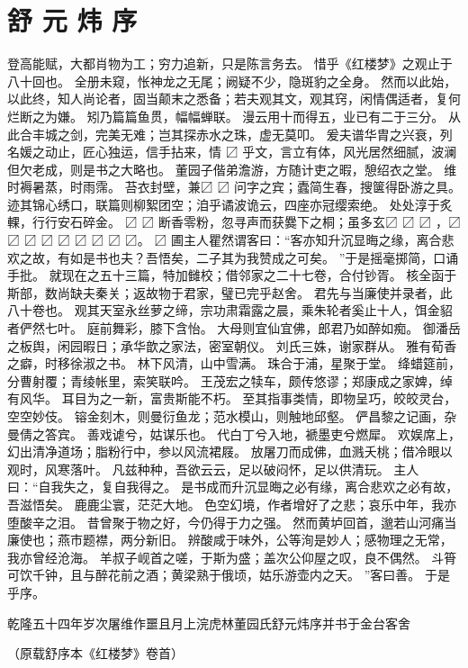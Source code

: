 \section*{舒 元 炜 序}
登高能赋，大都肖物为工；穷力追新，只是陈言务去。
惜乎《红楼梦》之观止于八十回也。
全册未窥，怅神龙之无尾；阙疑不少，隐斑豹之全身。
然而以此始，以此终，知人尚论者，固当颠末之悉备；若夫观其文，观其窍，闲情偶适者，复何烂断之为嫌。
矧乃篇篇鱼贯，幅幅蝉联。
漫云用十而得五，业已有二于三分。
从此合丰城之剑，完美无难；岂其探赤水之珠，虚无莫叩。
爰夫谱华胄之兴衰，列名媛之动止，匠心独运，信手拈来，情 〼 乎文，言立有体，风光居然细腻，波澜但欠老成，则是书之大略也。
董园子偕弟澹游，方随计吏之暇，憩绍衣之堂。
维时褥暑蒸，时雨霈。
苔衣封壁，兼〼 〼 问字之宾；蠹简生春，搜箧得卧游之具。
迹其锦心绣口，联篇则柳絮团空；洎乎谲波诡云，四座亦冠缨索绝。
处处淳于炙輠，行行安石碎金。
〼 〼 断香零粉，忽寻声而获爨下之桐；虽多玄〼 〼 〼 ，〼 〼 〼 〼
〼 〼 〼 〼 〼。
〼 圃主人瞿然谓客曰：“客亦知升沉显晦之缘，离合悲欢之故，有如是书也夫？吾悟矣，二子其为我赞成之可矣。
”于是摇毫掷简，口诵手批。
就现在之五十三篇，特加雠校；借邻家之二十七卷，合付钞胥。
核全函于斯部，数尚缺夫秦关；返故物于君家，璧已完乎赵舍。
君先与当廉使并录者，此八十卷也。
观其天室永丝萝之缔，宗功肃霜露之晨，乘朱轮者奚止十人，饵金貂者俨然七叶。
庭前舞彩，膝下含怡。
大母则宜仙宜佛，郎君乃如醉如痴。
御潘岳之板舆，闲园暇日；承华歆之家法，密室朝仪。
刘氏三姝，谢家群从。
雅有荀香之癖，时移徐淑之书。
林下风清，山中雪满。
珠合于浦，星聚于堂。
绛蜡筵前，分曹射覆；青绫帐里，索笑联吟。
王茂宏之犊车，颇传悠谬；郑康成之家婢，绰有风华。
耳目为之一新，富贵斯能不朽。
至其指事类情，即物呈巧，皎皎灵台，空空妙伎。
镕金刻木，则曼衍鱼龙；范水模山，则触地邱壑。
俨昌黎之记画，杂曼倩之答宾。
善戏谑兮，姑谋乐也。
代白丁兮入地，褫墨吏兮燃犀。
欢娱席上，幻出清净道场；脂粉行中，参以风流裙屐。
放屠刀而成佛，血溅夭桃；借冷眼以观时，风寒落叶。
凡兹种种，吾欲云云，足以破闷怀，足以供清玩。
主人曰：“自我失之，复自我得之。
是书成而升沉显晦之必有缘，离合悲欢之必有故，吾滋悟矣。
鹿鹿尘寰，茫茫大地。
色空幻境，作者增好了之悲；哀乐中年，我亦堕酸辛之泪。
昔曾聚于物之好，今仍得于力之强。
然而黄垆回首，邈若山河痛当廉使也；燕市题襟，两分新旧。
辨酸咸于味外，公等洵是妙人；感物理之无常，我亦曾经沧海。
羊叔子岘首之嗟，于斯为盛；盖次公仰屋之叹，良不偶然。
斗筲可饮千钟，且与醉花前之酒；黄梁熟于俄顷，姑乐游壶内之天。
”客曰善。
于是乎序。
\par
乾隆五十四年岁次屠维作噩且月上浣虎林董园氏舒元炜序并书于金台客舍\par
（原载舒序本《红楼梦》卷首）\par
